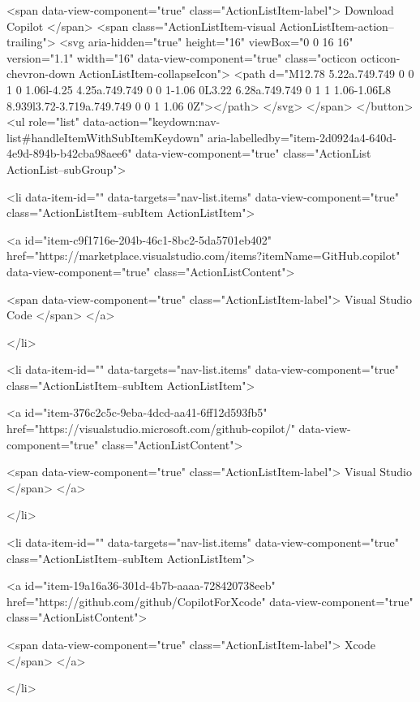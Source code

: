         <span data-view-component="true" class="ActionListItem-label">
          Download Copilot
</span>      
        <span class="ActionListItem-visual ActionListItem-action--trailing">
          <svg aria-hidden="true" height="16" viewBox="0 0 16 16" version="1.1" width="16" data-view-component="true" class="octicon octicon-chevron-down ActionListItem-collapseIcon">
    <path d="M12.78 5.22a.749.749 0 0 1 0 1.06l-4.25 4.25a.749.749 0 0 1-1.06 0L3.22 6.28a.749.749 0 1 1 1.06-1.06L8 8.939l3.72-3.719a.749.749 0 0 1 1.06 0Z"></path>
</svg>
        </span>
</button>
        <ul role="list" data-action="keydown:nav-list#handleItemWithSubItemKeydown" aria-labelledby="item-2d0924a4-640d-4e9d-894b-b42cba98aee6" data-view-component="true" class="ActionList ActionList--subGroup">
          
<li data-item-id="" data-targets="nav-list.items" data-view-component="true" class="ActionListItem--subItem ActionListItem">
    
    
    <a id="item-c9f1716e-204b-46c1-8bc2-5da5701eb402" href="https://marketplace.visualstudio.com/items?itemName=GitHub.copilot" data-view-component="true" class="ActionListContent">
      
        <span data-view-component="true" class="ActionListItem-label">
          Visual Studio Code
</span>      
</a>
  
</li>

          
<li data-item-id="" data-targets="nav-list.items" data-view-component="true" class="ActionListItem--subItem ActionListItem">
    
    
    <a id="item-376c2c5c-9eba-4dcd-aa41-6ff12d593fb5" href="https://visualstudio.microsoft.com/github-copilot/" data-view-component="true" class="ActionListContent">
      
        <span data-view-component="true" class="ActionListItem-label">
          Visual Studio
</span>      
</a>
  
</li>

          
<li data-item-id="" data-targets="nav-list.items" data-view-component="true" class="ActionListItem--subItem ActionListItem">
    
    
    <a id="item-19a16a36-301d-4b7b-aaaa-728420738eeb" href="https://github.com/github/CopilotForXcode" data-view-component="true" class="ActionListContent">
      
        <span data-view-component="true" class="ActionListItem-label">
          Xcode
</span>      
</a>
  
</li>

